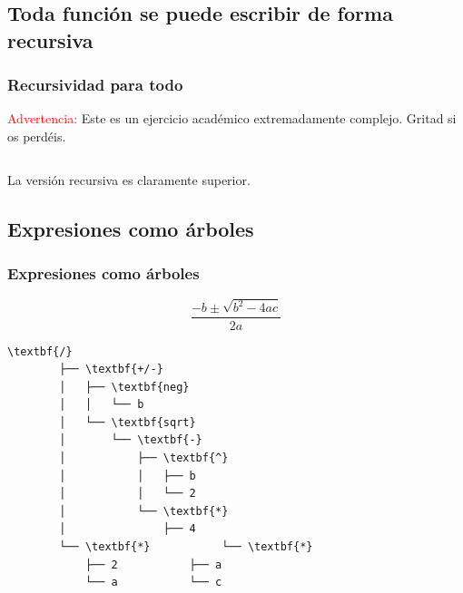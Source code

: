 \documentclass[xcolor=x11names,compress]{beamer}
\renewcommand{\(}{\begin{columns}}
\renewcommand{\)}{\end{columns}}
\newcommand{\<}[1]{\begin{column}{#1}}
\renewcommand{\>}{\end{column}}
\begin{document}
\subsection{Toda función se puede escribir de forma recursiva}
\begin{frame}[fragile]
    \frametitle{Recursividad para todo}
    \textcolor{red}{Advertencia:} Este es un ejercicio académico \pause extremadamente complejo\pause. Gritad si os perdéis. \pause
    \begin{columns}
        \begin{column}{.30\linewidth}
        \begin{block}
            \codeLengthIteration
        \end{block}
        \end{column} \pause
        \begin{column}{.65\linewidth}
        \begin{block}
            \codeLengthRecursion
        \end{block}
        \end{column}
    \end{columns} \pause
    La versión recursiva es claramente superior.

    \pause\codeLengthGoToHell

\end{frame}


\subsection{Expresiones como árboles}
\begin{frame}[fragile]
    \frametitle{Expresiones como árboles}
    $$\frac{-b\pm\sqrt{b^2-4ac}}{2a}$$
    
    \pause

\begin{Verbatim}[commandchars=\\\{\},codes={\catcode`$=3\catcode`_=8}]
        \textbf{/}
        ├── \textbf{+/-}
        │   ├── \textbf{neg}
        │   │   └── b
        │   └── \textbf{sqrt}
        │       └── \textbf{-}
        │           ├── \textbf{^}
        │           │   ├── b
        │           │   └── 2
        │           └── \textbf{*}
        │               ├── 4
        └── \textbf{*}           └── \textbf{*}
            ├── 2           ├── a
            └── a           └── c
\end{Verbatim}
\end{frame}
\end{document}
